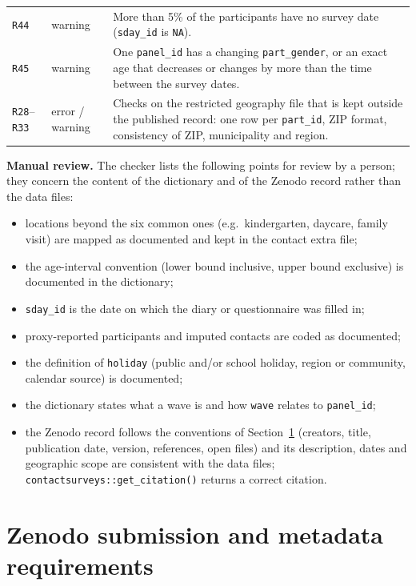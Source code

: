 \documentclass[11pt,a4paper]{article}
\begin{document}
{\begin{longtable}{p{1.1cm} p{1.7cm} p{11.9cm}}
\texttt{R44} & warning & More than 5\% of the participants have no survey date (\texttt{sday\_id} is \texttt{NA}). \\
\texttt{R45} & warning & One \texttt{panel\_id} has a changing \texttt{part\_gender}, or an exact age that decreases or changes by more than the time between the survey dates. \\
\texttt{R28}--\texttt{R33} & error / warning & Checks on the restricted geography file that is kept outside the published record: one row per \texttt{part\_id}, ZIP format, consistency of ZIP, municipality and region. \\
\bottomrule
\end{longtable}
}

\noindent \textbf{Manual review.} The checker lists the following points for review by a person; they concern the content of the dictionary and of the Zenodo record rather than the data files:
\begin{itemize}
    \item locations beyond the six common ones (e.g.\ kindergarten, daycare, family visit) are mapped as documented and kept in the contact extra file;
    \item the age-interval convention (lower bound inclusive, upper bound exclusive) is documented in the dictionary;
    \item \texttt{sday\_id} is the date on which the diary or questionnaire was filled in;
    \item proxy-reported participants and imputed contacts are coded as documented;
    \item the definition of \texttt{holiday} (public and/or school holiday, region or community, calendar source) is documented;
    \item the dictionary states what a wave is and how \texttt{wave} relates to \texttt{panel\_id};
    \item the Zenodo record follows the conventions of Section~\ref{sec:zenodo} (creators, title, publication date, version, references, open files) and its description, dates and geographic scope are consistent with the data files; \texttt{contactsurveys::get\_citation()} returns a correct citation.
\end{itemize}

\section{Zenodo submission and metadata requirements}
\label{sec:zenodo}
\end{document}
